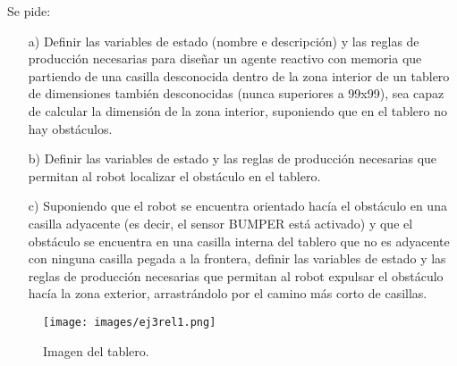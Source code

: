 Se pide: 
\begin{itemize}
    \item[a)] Definir  las  variables  de  estado  (nombre  e  descripción)  y  las  reglas  de  producción 
    necesarias  para  diseñar  un  agente  reactivo  con  memoria  que  partiendo  de  una  casilla 
    desconocida dentro de la zona interior de un tablero de dimensiones también 
    desconocidas (nunca superiores a 99x99), sea capaz de calcular la dimensión de la zona 
    interior, suponiendo que en el tablero no hay obstáculos. 
    \item [b)] Definir  las  variables  de  estado  y  las  reglas  de  producción  necesarias  que  permitan  al 
    robot localizar el obstáculo en el tablero. 
    \item [c)] Suponiendo  que  el  robot  se  encuentra  orientado  hacía  el  obstáculo  en  una  casilla 
    adyacente (es decir, el sensor BUMPER está activado) y que el obstáculo se encuentra 
    en  una  casilla  interna  del  tablero  que  no  es  adyacente  con  ninguna  casilla  pegada  a  la 
    frontera,  definir  las  variables  de  estado  y  las  reglas  de  producción  necesarias  que 
    permitan  al  robot  expulsar  el  obstáculo  hacía  la  zona  exterior,  arrastrándolo  por  el 
    camino más corto de casillas. 
\end{itemize}

\begin{figure}[H]
    \centering
    \texttt{[image: images/ej3rel1.png]}
    \caption{Imagen del tablero.}
    \label{fig:tablero}
\end{figure}

        
        
        
        


